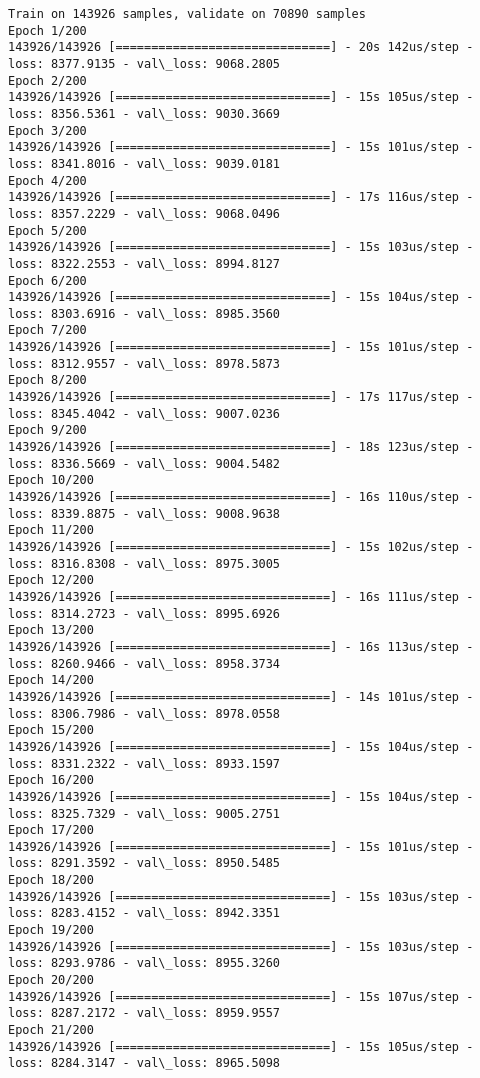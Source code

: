 \documentclass[11pt]{article}
\begin{document}
    \begin{Verbatim}[commandchars=\\\{\}]
Train on 143926 samples, validate on 70890 samples
Epoch 1/200
143926/143926 [==============================] - 20s 142us/step - loss: 8377.9135 - val\_loss: 9068.2805
Epoch 2/200
143926/143926 [==============================] - 15s 105us/step - loss: 8356.5361 - val\_loss: 9030.3669
Epoch 3/200
143926/143926 [==============================] - 15s 101us/step - loss: 8341.8016 - val\_loss: 9039.0181
Epoch 4/200
143926/143926 [==============================] - 17s 116us/step - loss: 8357.2229 - val\_loss: 9068.0496
Epoch 5/200
143926/143926 [==============================] - 15s 103us/step - loss: 8322.2553 - val\_loss: 8994.8127
Epoch 6/200
143926/143926 [==============================] - 15s 104us/step - loss: 8303.6916 - val\_loss: 8985.3560
Epoch 7/200
143926/143926 [==============================] - 15s 101us/step - loss: 8312.9557 - val\_loss: 8978.5873
Epoch 8/200
143926/143926 [==============================] - 17s 117us/step - loss: 8345.4042 - val\_loss: 9007.0236
Epoch 9/200
143926/143926 [==============================] - 18s 123us/step - loss: 8336.5669 - val\_loss: 9004.5482
Epoch 10/200
143926/143926 [==============================] - 16s 110us/step - loss: 8339.8875 - val\_loss: 9008.9638
Epoch 11/200
143926/143926 [==============================] - 15s 102us/step - loss: 8316.8308 - val\_loss: 8975.3005
Epoch 12/200
143926/143926 [==============================] - 16s 111us/step - loss: 8314.2723 - val\_loss: 8995.6926
Epoch 13/200
143926/143926 [==============================] - 16s 113us/step - loss: 8260.9466 - val\_loss: 8958.3734
Epoch 14/200
143926/143926 [==============================] - 14s 101us/step - loss: 8306.7986 - val\_loss: 8978.0558
Epoch 15/200
143926/143926 [==============================] - 15s 104us/step - loss: 8331.2322 - val\_loss: 8933.1597
Epoch 16/200
143926/143926 [==============================] - 15s 104us/step - loss: 8325.7329 - val\_loss: 9005.2751
Epoch 17/200
143926/143926 [==============================] - 15s 101us/step - loss: 8291.3592 - val\_loss: 8950.5485
Epoch 18/200
143926/143926 [==============================] - 15s 103us/step - loss: 8283.4152 - val\_loss: 8942.3351
Epoch 19/200
143926/143926 [==============================] - 15s 103us/step - loss: 8293.9786 - val\_loss: 8955.3260
Epoch 20/200
143926/143926 [==============================] - 15s 107us/step - loss: 8287.2172 - val\_loss: 8959.9557
Epoch 21/200
143926/143926 [==============================] - 15s 105us/step - loss: 8284.3147 - val\_loss: 8965.5098

\end{Verbatim}
\end{document}
